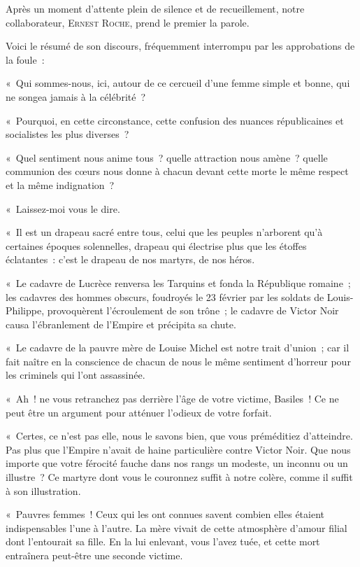 \documentclass[french,twoside]{book} %
\newenvironment{quoteblock}%
  {\begin{quoting}}
  {\end{quoting}}
\newenvironment{quotebar}{%
    \def\FrameCommand{{\color{rubric!10!}\vrule width 0.5em} \hspace{0.9em}}%
    \def\OuterFrameSep{\itemsep} %
    \MakeFramed {\advance\hsize-\width \FrameRestore}
  }%
  {%
    \endMakeFramed
  }
\renewenvironment{quoteblock}%
  {%
    \savenotes
    \setstretch{0.9}
    \normalfont
    \begin{quotebar}
  }
  {%
    \end{quotebar}
    \spewnotes
  }
\begin{document}
\begin{quoteblock}
 \noindent Après un moment d’attente plein de silence et de recueillement, notre collaborateur, E{\scshape rnest} R{\scshape oche}, prend le premier la parole.\par
 Voici le résumé de son discours, fréquemment interrompu par les approbations de la foule :\par
 \bigbreak
 \noindent « Qui sommes-nous, ici, autour de ce cercueil d’une femme simple et bonne, qui ne songea jamais à la célébrité ?\par
 « Pourquoi, en cette circonstance, cette confusion des nuances républicaines et socialistes les plus diverses ?\par
 « Quel sentiment nous anime tous ? quelle attraction nous amène ? quelle communion des cœurs nous donne à chacun devant cette morte le même respect et la même indignation ?\par
 « Laissez-moi vous le dire.\par
 « Il est un drapeau sacré entre tous, celui que les peuples n’arborent qu’à certaines époques solennelles, drapeau qui électrise plus que les étoffes éclatantes : c’est le drapeau de nos martyrs, de nos héros.\par
 « Le cadavre de Lucrèce renversa les Tarquins et fonda la République romaine ; les cadavres des hommes obscurs, foudroyés le 23 février par les soldats de Louis-Philippe, provoquèrent l’écroulement de son trône ; le cadavre de Victor Noir causa l’ébranlement de l’Empire et précipita sa chute.\par
 « Le cadavre de la pauvre mère de Louise Michel est notre trait d’union ; car il fait naître en la conscience de chacun de nous le même sentiment d’horreur pour les criminels qui l’ont assassinée.\par
 « Ah ! ne vous retranchez pas derrière l’âge de votre victime, Basiles ! Ce ne peut être un argument pour atténuer l’odieux de votre forfait.\par
 « Certes, ce n’est pas elle, nous le savons bien, que vous préméditiez d’atteindre. Pas plus que l’Empire n’avait de haine particulière contre Victor Noir. Que nous importe que votre férocité fauche dans nos rangs un modeste, un inconnu ou un illustre ? Ce martyre dont vous le couronnez suffit à notre colère, comme il suffit à son illustration.\par
 « Pauvres femmes ! Ceux qui les ont connues savent combien  elles étaient indispensables l’une à l’autre. La mère vivait de cette atmosphère d’amour filial dont l’entourait sa fille. En la lui enlevant, vous l’avez tuée, et cette mort entraînera peut-être une seconde victime.\par

\end{quoteblock}
\end{document}
